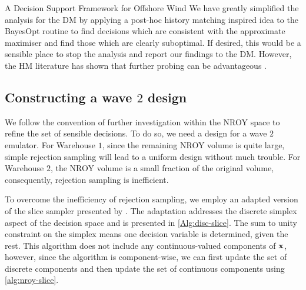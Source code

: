 \begin{chapter}{A Decision Support Framework for Offshore Wind \label{Ch:ds-for-ow}}
We have greatly simplified the analysis for the DM by applying a post-hoc history matching inspired idea to the BayesOpt routine to find decisions which are consistent with the approximate maximiser and find those which are clearly suboptimal. If desired, this would be a sensible place to stop the analysis and report our findings to the DM. However, the HM literature has shown that further probing can be advantageous \citep{Jackson2018, Vernon2022}.

\subsection{Constructing a wave $2$ design}

We follow the convention of further investigation within the NROY space to refine the set of sensible decisions. To do so, we need a design for a wave $2$ emulator. For Warehouse $1$, since the remaining NROY volume is quite large, simple rejection sampling will lead to a uniform design without much trouble. For Warehouse $2$, the NROY volume is a small fraction of the original volume, consequently, rejection sampling is inefficient.

To overcome the inefficiency of rejection sampling, we employ an adapted version of the slice sampler presented by \citet{Andrianakis2017a}. The adaptation addresses the discrete simplex aspect of the decision space and is presented in \cref{Alg:disc-slice}. The sum to unity constraint on the simplex means one decision variable is determined, given the rest. This algorithm does not include any continuous-valued components of $\mathbf{x}$, however, since the algorithm is component-wise, we can first update the set of discrete components and then update the set of continuous components using \cref{alg:nroy-slice}.


\end{chapter}
